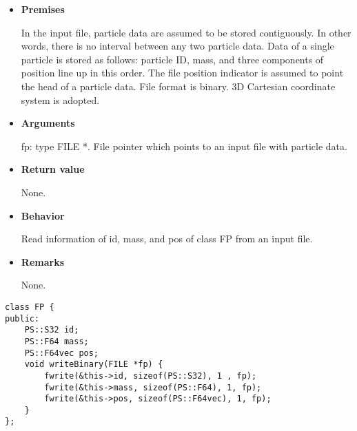 \begin{itemize}

\item {\bf Premises}

  In the input file, particle data are assumed to be stored contiguously. In other words, there is no interval between any two particle data. Data of a single particle is stored as follows: particle ID, mass, and three components of position line up in this order. The file position indicator is assumed to point the head of a particle data. File format is binary. 3D Cartesian coordinate system is adopted.

\item {\bf Arguments}

  fp: type FILE *. File pointer which points to an input file with particle data.
  
\item {\bf Return value}

  None.
  
\item {\bf Behavior}

  Read information of id, mass, and pos of class FP from an input
  file.
  
\item {\bf Remarks}

  None.
  
\end{itemize}


\begin{screen}
\begin{verbatim}
class FP {
public:
    PS::S32 id;
    PS::F64 mass;
    PS::F64vec pos;
    void writeBinary(FILE *fp) {
        fwrite(&this->id, sizeof(PS::S32), 1 , fp);
        fwrite(&this->mass, sizeof(PS::F64), 1, fp);
        fwrite(&this->pos, sizeof(PS::F64vec), 1, fp);
    }
};
\end{verbatim}
\end{screen}

